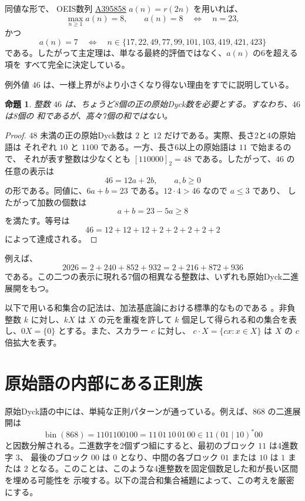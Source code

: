 \documentclass[12pt]{ltjsarticle}
\theoremstyle{plain}
\newtheorem{proposition}[theorem]{命題}
\newcommand{\seqnum}[1]{\href{https://oeis.org/#1}{\rm \underline{#1}}}
\begin{document}
同値な形で、 OEIS数列 \seqnum{A395858} \cite{OEIS-A395858} $a(n)=r(2n)$ を用いれば、
\[
        \max_{n\geq1}a(n)=8,
        \qquad
        a(n)=8\quad\Longleftrightarrow\quad n=23,
\]
かつ
\[
 a(n)=7
 \quad\Longleftrightarrow\quad
 n\in\{17,22,49,77,99,101,103,419,421,423\}
\]
である。したがって主定理は、単なる最終的評価ではなく、$a(n)$ の6を超える項を
すべて完全に決定している。

例外値 $46$ は、一様上界が8より小さくなり得ない理由をすでに説明している。

\begin{proposition}\label{prop:46}
整数 $46$ は、ちょうど8個の正の原始Dyck数を必要とする。すなわち、$46$ は8個の
和であるが、高々7個の和ではない。
\end{proposition}

\begin{proof}
$48$ 未満の正の原始Dyck数は $2$ と $12$ だけである。実際、長さ2と4の原始語は
それぞれ $10$ と $1100$ である。一方、長さ6以上の原始語は $11$ で始まるので、
それが表す整数は少なくとも $[110000]_2=48$ である。したがって、$46$ の任意の表示は
\[
        46=12a+2b,
        \qquad a,b\geq0
\]
の形である。同値に、$6a+b=23$ である。$12\cdot4>46$ なので $a\leq3$ であり、
したがって加数の個数は
\[
        a+b=23-5a\geq8
\]
を満たす。等号は
\[
        46=12+12+12+2+2+2+2+2
\]
によって達成される。
\end{proof}

例えば、
\[
 2026=2+240+852+932=2+216+872+936
\]
である。この二つの表示に現れる7個の相異なる整数は、いずれも原始Dyck二進展開をもつ。

以下で用いる和集合の記法は、加法基底論における標準的なものである
\cite[Chap.\ 1]{Nathanson}。非負整数 $k$ に対し、$kX$ は $X$ の元を重複を許して
$k$ 個足して得られる和の集合を表し、$0X=\{0\}$ とする。また、スカラー $c$ に対し、
$c\cdot X=\{cx:x\in X\}$ は $X$ の $c$ 倍拡大を表す。


\section{原始語の内部にある正則族}

原始Dyck語の中には、単純な正則パターンが通っている。例えば、$868$ の二進展開は
\[
 \operatorname{bin}(868)=1101100100=11\,01\,10\,01\,00
 \in 11(01\mid10)^*00
\]
と因数分解される。二進数字を2個ずつ組にすると、最初のブロック $11$ は4進数字 $3$、
最後のブロック $00$ は $0$ となり、中間の各ブロック $01$ または $10$ は $1$ または
$2$ となる。このことは、このような4進整数を固定個数足した和が長い区間を埋める可能性を
示唆する。以下の混合和集合補題によって、この考えを厳密にする。
\end{document}
